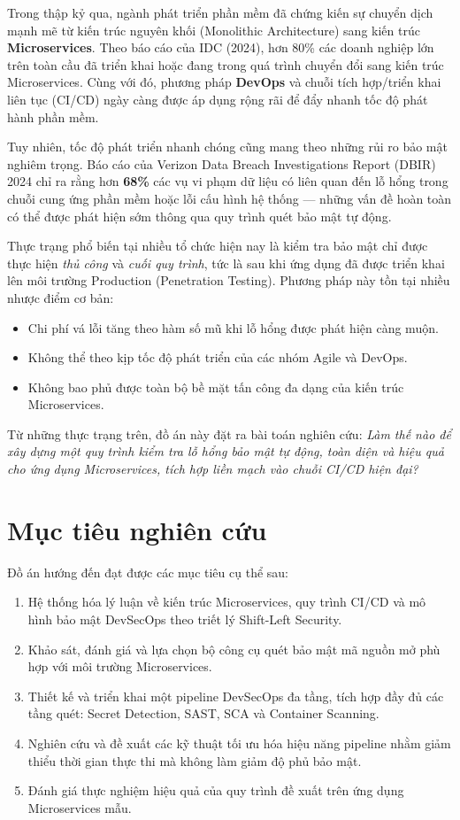 \documentclass[12pt,a4paper]{report}
\begin{document}
Trong thập kỷ qua, ngành phát triển phần mềm đã chứng kiến sự chuyển dịch mạnh mẽ từ kiến trúc nguyên khối (Monolithic Architecture) sang kiến trúc \textbf{Microservices}. Theo báo cáo của IDC (2024), hơn 80\% các doanh nghiệp lớn trên toàn cầu đã triển khai hoặc đang trong quá trình chuyển đổi sang kiến trúc Microservices. Cùng với đó, phương pháp \textbf{DevOps} và chuỗi tích hợp/triển khai liên tục (CI/CD) ngày càng được áp dụng rộng rãi để đẩy nhanh tốc độ phát hành phần mềm.

Tuy nhiên, tốc độ phát triển nhanh chóng cũng mang theo những rủi ro bảo mật nghiêm trọng. Báo cáo của Verizon Data Breach Investigations Report (DBIR) 2024 chỉ ra rằng hơn \textbf{68\%} các vụ vi phạm dữ liệu có liên quan đến lỗ hổng trong chuỗi cung ứng phần mềm hoặc lỗi cấu hình hệ thống --- những vấn đề hoàn toàn có thể được phát hiện sớm thông qua quy trình quét bảo mật tự động.

Thực trạng phổ biến tại nhiều tổ chức hiện nay là kiểm tra bảo mật chỉ được thực hiện \textit{thủ công} và \textit{cuối quy trình}, tức là sau khi ứng dụng đã được triển khai lên môi trường Production (Penetration Testing). Phương pháp này tồn tại nhiều nhược điểm cơ bản:
\begin{itemize}[leftmargin=2cm]
    \item Chi phí vá lỗi tăng theo hàm số mũ khi lỗ hổng được phát hiện càng muộn.
    \item Không thể theo kịp tốc độ phát triển của các nhóm Agile và DevOps.
    \item Không bao phủ được toàn bộ bề mặt tấn công đa dạng của kiến trúc Microservices.
\end{itemize}

Từ những thực trạng trên, đồ án này đặt ra bài toán nghiên cứu: \textit{Làm thế nào để xây dựng một quy trình kiểm tra lỗ hổng bảo mật tự động, toàn diện và hiệu quả cho ứng dụng Microservices, tích hợp liền mạch vào chuỗi CI/CD hiện đại?}

\section{Mục tiêu nghiên cứu}

Đồ án hướng đến đạt được các mục tiêu cụ thể sau:
\begin{enumerate}[leftmargin=2cm]
    \item Hệ thống hóa lý luận về kiến trúc Microservices, quy trình CI/CD và mô hình bảo mật DevSecOps theo triết lý Shift-Left Security.
    \item Khảo sát, đánh giá và lựa chọn bộ công cụ quét bảo mật mã nguồn mở phù hợp với môi trường Microservices.
    \item Thiết kế và triển khai một pipeline DevSecOps đa tầng, tích hợp đầy đủ các tầng quét: Secret Detection, SAST, SCA và Container Scanning.
    \item Nghiên cứu và đề xuất các kỹ thuật tối ưu hóa hiệu năng pipeline nhằm giảm thiểu thời gian thực thi mà không làm giảm độ phủ bảo mật.
    \item Đánh giá thực nghiệm hiệu quả của quy trình đề xuất trên ứng dụng Microservices mẫu.
\end{enumerate}
\end{document}
